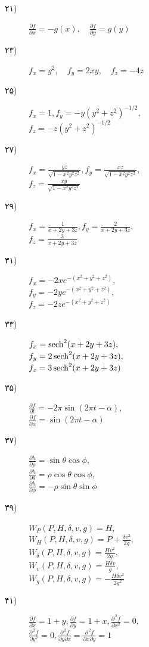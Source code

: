 \begin {description}
\item [
\protect ۲۱)
]
 $\tfrac {\partial f}{\partial x}=-g(x),\quad \tfrac {\partial f}{\partial y}=g(y)$ 
\item [
\protect ۲۳)
]
 $f_x=y^2,\quad f_y=2xy,\quad f_z=-4z$ 
\item [
\protect ۲۵)
]
 $f_x=1,f_y=-y(y^2+z^2)^{-1/2},$\\ $f_z=-z(y^2+z^2)^{-1/2}$ 
\item [
\protect ۲۷)
]
 $f_x=\tfrac {yz}{\sqrt {1-x^2y^2z^2}}, f_y=\tfrac {xz}{\sqrt {1-x^2y^2z^2}},$\\ $f_z=\tfrac {xy}{\sqrt {1-x^2y^2z^2}}$ 
\item [
\protect ۲۹)
]
 $f_x=\tfrac {1}{x+2y+3z},f_y=\tfrac {2}{x+2y+3z},$\\ $f_z=\tfrac {3}{x+2y+3z}$ 
\item [
\protect ۳۱)
]
 $f_x=-2xe^{-(x^2+y^2+z^2)},$\\ $f_y=-2ye^{-(x^2+y^2+z^2)},$\\ $f_z=-2ze^{-(x^2+y^2+z^2)}$ 
\item [
\protect ۳۳)
]
 $f_x=\operatorname{sech} ^2(x+2y+3z),$\\ $f_y=2\operatorname{sech} ^2(x+2y+3z),$\\ $f_z=3\operatorname{sech} ^2(x+2y+3z)$ 
\item [
\protect ۳۵)
]
 $\tfrac {\partial f}{\partial t}=-2\pi \sin (2\pi t-\alpha ),$\\ $\tfrac {\partial f}{\partial \alpha }=\sin (2\pi t-\alpha )$ 
\item [
\protect ۳۷)
]
 $\tfrac {\partial h}{\partial \rho }=\sin \theta \cos \phi ,$\\ $\tfrac {\partial h}{\partial \theta }=\rho \cos \theta \cos \phi ,$\\ $\frac {\partial h}{\partial \phi }=-\rho \sin \theta \sin \phi $ 
\item [
\protect ۳۹)
]
 $W_P(P,H,\delta ,v,g)=H,$\\ $W_H(P,H,\delta ,v,g)=P+\tfrac {\delta v^2}{2g},$\\ $W_{\delta }(P,H,\delta ,v,g)=\tfrac {Hv^2}{2g},$\\ $W_v(P,H,\delta ,v,g)=\tfrac {H\delta v}{g},$\\ $W_g(P,H,\delta ,v,g)=-\tfrac {H\delta v^2}{2g^2}$ 
\item [
\protect ۴۱)
]
 $\tfrac {\partial f}{\partial x}=1+y, \tfrac {\partial f}{\partial y}=1+x,\frac {\partial ^{\,2} f}{\partial x^2}=0,$\\ $\frac {\partial ^{\,2} f}{\partial y^2}=0,\frac {\partial ^{\,2} f}{\partial y\partial x}=\frac {\partial ^{\,2} f}{\partial x\partial y}=1$ 

\end{description}
